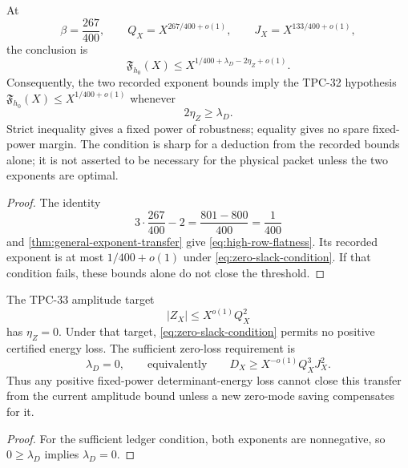 \begin{corollary}
\label{cor:zero-slack}
At
\begin{equation}
 \beta=\frac{267}{400},
 \qquad
 Q_X=X^{267/400+o(1)},
 \qquad
 J_X=X^{133/400+o(1)},
 \label{eq:high-row-scales}
\end{equation}
the conclusion is
\begin{equation}
 \boxed{\displaystyle
 \mathfrak F_{h_0}(X)
 \le
 X^{1/400+\lambda_D-2\eta_Z+o(1)}.}
 \label{eq:high-row-flatness}
\end{equation}
Consequently, the two recorded exponent bounds imply the TPC-32
hypothesis
\(\mathfrak F_{h_0}(X)\le X^{1/400+o(1)}\) whenever
\begin{equation}
 \boxed{2\eta_Z\ge\lambda_D.}
 \label{eq:zero-slack-condition}
\end{equation}
Strict inequality gives a fixed power of robustness; equality gives
no spare fixed-power margin.  The condition is sharp for a deduction
from the recorded bounds alone; it is not asserted to be necessary
for the physical packet unless the two exponents are optimal.
\end{corollary}

\begin{proof}
The identity
\[
 3\cdot\frac{267}{400}-2
 =\frac{801-800}{400}
 =\frac1{400}
\]
and \cref{thm:general-exponent-transfer} give
\eqref{eq:high-row-flatness}.  Its recorded exponent is at most
\(1/400+o(1)\) under \eqref{eq:zero-slack-condition}.  If that
condition fails, these bounds alone do not close the threshold.
\end{proof}

\begin{corollary}
\label{cor:current-target}
The TPC-33 amplitude target
\[
 |Z_X|\le X^{o(1)}Q_X^2
\]
has \(\eta_Z=0\).  Under that target,
\eqref{eq:zero-slack-condition} permits no positive certified energy
loss.  The sufficient zero-loss requirement is
\begin{equation}
 \lambda_D=0,
 \qquad\text{equivalently}\qquad
 D_X\ge X^{-o(1)}Q_X^3J_X^2.
 \label{eq:natural-energy-required}
\end{equation}
Thus any positive fixed-power determinant-energy loss cannot close
this transfer from the current amplitude bound unless a new
zero-mode saving compensates for it.
\end{corollary}

\begin{proof}
For the sufficient ledger condition, both exponents are nonnegative,
so \(0\ge\lambda_D\) implies \(\lambda_D=0\).
\end{proof}

